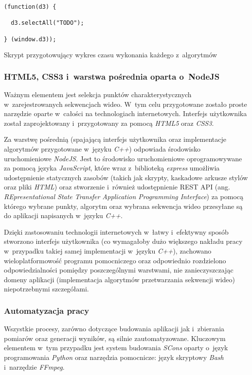       \begin{sample}[ht]
        \begin{verbatim}
(function(d3) {

  d3.selectAll("TODO");

} (window.d3));
        \end{verbatim}
        \caption{Skrypt przygotowujący wykres czasu wykonania każdego z~algorytmów}
        \label{ChartForRunningTimePerAlgorithm}
      \end{sample}

      \subsubsection{HTML5, CSS3 i~warstwa pośrednia oparta o~NodeJS}\label{Subsection_NodeJS}
      Ważnym elementem jest selekcja punktów charakterystycznych w~zarejestrowanych sekwencjach wideo. W~tym celu przygotowane zostało proste narzędzie oparte w~całości na technologiach internetowych. Interfejs użytkownika został zaprojektowany i~przygotowany za pomocą \textit{HTML5} oraz \textit{CSS3}.

      Za warstwę pośrednią (spajającą interfejs użytkownika oraz implementacje algorytmów przygotowane w~języku \textit{C++}) odpowiada środowisko uruchomieniowe \textit{NodeJS}. Jest to środowisko uruchomieniowe oprogramowywane za pomocą języka \textit{JavaScript}, które wraz z~biblioteką \textit{express} umożliwia udostępnienie statycznych zasobów (takich jak skrypty, kaskadowe arkusze stylów oraz pliki \textit{HTML}) oraz stworzenie i~również udostępnienie REST API (ang. \textit{REpresentational State Transfer Application Programming Interface}) za pomocą którego wybrane punkty, algorytm oraz wybrana sekwencja wideo przesyłane są do aplikacji napisanych w~języku \textit{C++}.

      Dzięki zastosowaniu technologii internetowych w~łatwy i~efektywny sposób stworzono interfejs użytkownika (co wymagałoby dużo większego nakładu pracy w~przypadku takiej samej implementacji w~języku \textit{C++}), zachowano wieloplatformowość programu pomocniczego oraz odpowiednio rozdzielono odpowiedzialności pomiędzy poszczególnymi warstwami, nie zanieczyszczając domeny aplikacji (implementacja algorytmów przetwarzania sekwencji wideo) niepotrzebnymi szczegółami.

      \subsubsection{Automatyzacja pracy}
      Wszystkie procesy, zarówno dotyczące budowania aplikacji jak i~zbierania pomiarów oraz generacji wyników, są silnie zautomatyzowane. Kluczowym elementem w~tym przypadku jest system budowania \textit{SCons} oparty o~język programowania \textit{Python} oraz narzędzia pomocnicze: język skryptowy \textit{Bash} i~narzędzie \textit{FFmpeg}.

